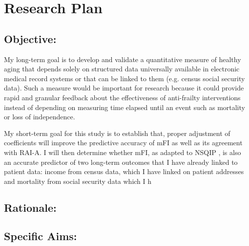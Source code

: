 \section{Research Plan }\label{research-plan}


\subsection{Objective:}\label{objective}
  
My long-term goal is to develop and validate a quantitative measure of healthy aging that depends solely on structured data universally available in electronic medical record systems or that can be linked to them (e.g. census social security data). Such a measure would be important for research because it could provide rapid and granular feedback about the effectiveness of anti-frailty interventions instead of depending on measuring time elapsed until an event such as mortality or loss of independence. 

My short-term goal for this study is to establish that, proper adjustment of coefficients will improve the predictive accuracy of mFI as well as its agreement with RAI-A. I will then determine whether mFI, as adapted to NSQIP \cite{Rockwood_2005}, is also an accurate predictor of two long-term outcomes that I have already linked to patient data: income from census data, which I have linked on patient addresses and mortality from social security data which I  h

\subsection{Rationale:}\label{rationale}

\subsection{Specific Aims:}\label{specific-aims}
